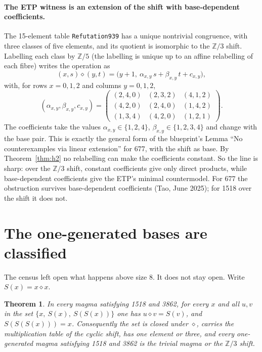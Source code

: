 \documentclass[11pt]{article}
\newtheorem{theorem}{Theorem}
\theoremstyle{remark}\newtheorem*{remark}{Remark}
\newcommand{\op}{\diamond}
\newcommand{\Z}{\mathbb{Z}}
\begin{document}
\paragraph{The ETP witness is an extension of the shift with base-dependent coefficients.} The 15-element table \texttt{Refutation939} has a unique nontrivial congruence, with three classes of five elements, and its quotient is isomorphic to the $\Z/3$ shift. Labelling each class by $\Z/5$ (the labelling is unique up to an affine relabelling of each fibre) writes the operation as
\[
(x,s)\op(y,t)=\bigl(y+1,\ \alpha_{x,y}\,s+\beta_{x,y}\,t+c_{x,y}\bigr),
\]
with, for rows $x=0,1,2$ and columns $y=0,1,2$,
\[
(\alpha_{x,y},\beta_{x,y},c_{x,y})=
\begin{pmatrix}(2,4,0)&(2,3,2)&(4,1,2)\\(4,2,0)&(2,4,0)&(1,4,2)\\(1,3,4)&(4,2,0)&(1,2,1)\end{pmatrix}.
\] The coefficients take the values $\alpha_{x,y}\in\{1,2,4\}$, $\beta_{x,y}\in\{1,2,3,4\}$ and change with the base pair. This is exactly the general form of the blueprint's Lemma ``No counterexamples via linear extension'' for 677, with the shift as base. By Theorem~\ref{thm:h2} no relabelling can make the coefficients constant. So the line is sharp: over the $\Z/3$ shift, constant coefficients give only direct products, while base-dependent coefficients give the ETP's minimal countermodel. For 677 the obstruction survives base-dependent coefficients (Tao, June 2025); for 1518 over the shift it does not.

\section{The one-generated bases are classified}\label{sec:l1}

The census left open what happens above size 8. It does not stay open. Write $S(x)=x\op x$.

\begin{theorem}\label{thm:closure}
In every magma satisfying 1518 and 3862, for every $x$ and all $u,v$ in the set $\{x,\ S(x),\ S(S(x))\}$ one has $u\op v=S(v)$, and $S(S(S(x)))=x$. Consequently the set is closed under $\op$, carries the multiplication table of the cyclic shift, has one element or three, and every one-generated magma satisfying 1518 and 3862 is the trivial magma or the $\Z/3$ shift.
\end{theorem}
\end{document}

